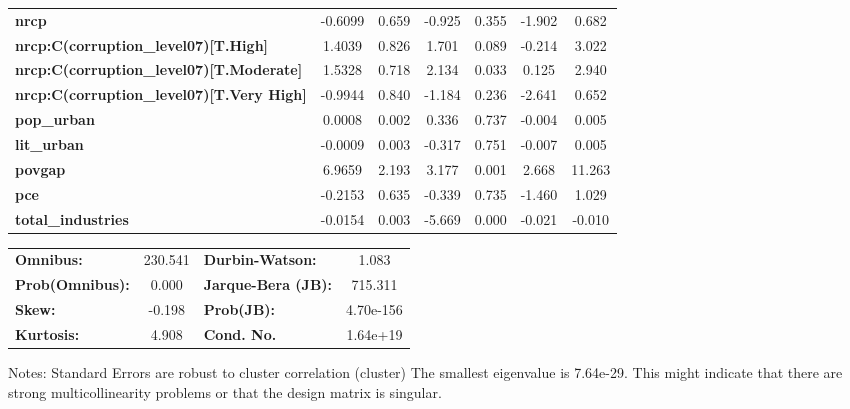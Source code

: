 \begin{center}
\begin{tabular}{lcccccc}
\textbf{nrcp}                                                                                       &      -0.6099  &        0.659     &    -0.925  &         0.355        &       -1.902    &        0.682     \\
\textbf{nrcp:C(corruption\_level07)[T.High]}                                                        &       1.4039  &        0.826     &     1.701  &         0.089        &       -0.214    &        3.022     \\
\textbf{nrcp:C(corruption\_level07)[T.Moderate]}                                                    &       1.5328  &        0.718     &     2.134  &         0.033        &        0.125    &        2.940     \\
\textbf{nrcp:C(corruption\_level07)[T.Very High]}                                                   &      -0.9944  &        0.840     &    -1.184  &         0.236        &       -2.641    &        0.652     \\
\textbf{pop\_urban}                                                                                 &       0.0008  &        0.002     &     0.336  &         0.737        &       -0.004    &        0.005     \\
\textbf{lit\_urban}                                                                                 &      -0.0009  &        0.003     &    -0.317  &         0.751        &       -0.007    &        0.005     \\
\textbf{povgap}                                                                                     &       6.9659  &        2.193     &     3.177  &         0.001        &        2.668    &       11.263     \\
\textbf{pce}                                                                                        &      -0.2153  &        0.635     &    -0.339  &         0.735        &       -1.460    &        1.029     \\
\textbf{total\_industries}                                                                          &      -0.0154  &        0.003     &    -5.669  &         0.000        &       -0.021    &       -0.010     \\
\bottomrule
\end{tabular}
\begin{tabular}{lclc}
\textbf{Omnibus:}       & 230.541 & \textbf{  Durbin-Watson:     } &     1.083  \\
\textbf{Prob(Omnibus):} &   0.000 & \textbf{  Jarque-Bera (JB):  } &   715.311  \\
\textbf{Skew:}          &  -0.198 & \textbf{  Prob(JB):          } & 4.70e-156  \\
\textbf{Kurtosis:}      &   4.908 & \textbf{  Cond. No.          } &  1.64e+19  \\
\bottomrule
\end{tabular}
\end{center}

Notes: \newline
 [1] Standard Errors are robust to cluster correlation (cluster) \newline
 [2] The smallest eigenvalue is 7.64e-29. This might indicate that there are \newline
 strong multicollinearity problems or that the design matrix is singular.